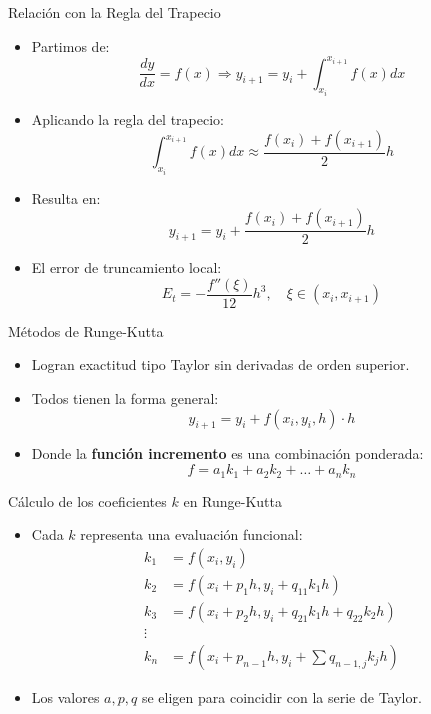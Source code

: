 \documentclass[main.tex]{subfiles}
\begin{document}
\begin{frame}{\small Relación con la Regla del Trapecio}
\begin{itemize}
  \item Partimos de:
  \[
    \frac{dy}{dx} = f(x) \Rightarrow y_{i+1} = y_i + \int_{x_i}^{x_{i+1}} f(x) dx
  \]
  \item Aplicando la regla del trapecio:
  \[
    \int_{x_i}^{x_{i+1}} f(x) dx \approx \frac{f(x_i) + f(x_{i+1})}{2} h
  \]
  \item Resulta en:
  \[
    y_{i+1} = y_i + \frac{f(x_i) + f(x_{i+1})}{2} h
  \]
  \item El error de truncamiento local:
  \[
    E_t = -\frac{f''(\xi)}{12} h^3, \quad \xi \in (x_i, x_{i+1})
  \]
\end{itemize}
\end{frame}
\begin{frame}{\small Métodos de Runge-Kutta}
\begin{itemize}
  \item Logran exactitud tipo Taylor sin derivadas de orden superior.
  \item Todos tienen la forma general:
  \[
    y_{i+1} = y_i + f(x_i, y_i, h) \cdot h
  \]
  \item Donde la \textbf{función incremento} es una combinación ponderada:
  \[
    f = a_1 k_1 + a_2 k_2 + \dots + a_n k_n
  \]
\end{itemize}
\end{frame}

\begin{frame}{\small Cálculo de los coeficientes \( k \) en Runge-Kutta}
\begin{itemize}
  \item Cada \( k \) representa una evaluación funcional:
  \begin{align*}
    k_1 &= f(x_i, y_i) \\
    k_2 &= f(x_i + p_1 h, y_i + q_{11} k_1 h) \\
    k_3 &= f(x_i + p_2 h, y_i + q_{21} k_1 h + q_{22} k_2 h) \\
    \vdots \\
    k_n &= f(x_i + p_{n-1} h, y_i + \sum q_{n-1,j} k_j h)
  \end{align*}
  \item Los valores \( a, p, q \) se eligen para coincidir con la serie de Taylor.
\end{itemize}
\end{frame}
\end{document}
